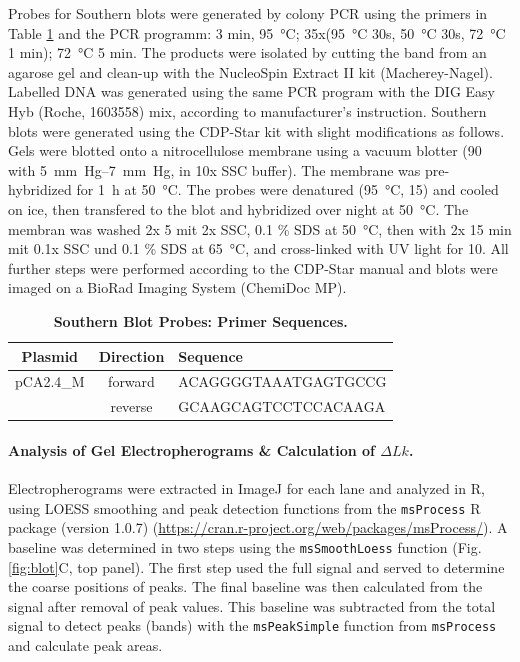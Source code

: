 \documentclass[10pt,a4]{article}
\newcommand{\remove}[1]{\begingroup\color{gray}\endgroup}
\begin{document}
Probes for Southern blots were generated by colony PCR using the
primers in Table \ref{tab:blot} and the PCR programm: 3 min,
\SI{95}{\celsius}; 35x(\SI{95}{\celsius} 30s, \SI{50}{\celsius} 30s,
\SI{72}{\celsius} 1 min); \SI{72}{\celsius} 5 min.  The products were
isolated by cutting the band from an agarose gel and clean-up with the
NucleoSpin Extract II kit (Macherey-Nagel).  Labelled DNA was
generated using the same PCR program with the DIG Easy Hyb (Roche,
1603558) mix, according to manufacturer's instruction.
%
Southern blots were generated using the CDP-Star kit with slight
modifications as follows.  Gels were blotted onto a nitrocellulose
membrane using a vacuum blotter \remove{model?} (\SI{90}{\min} with
\SIrange{5}{7}{mm Hg}, in 10x SSC buffer). The membrane was
pre-hybridized for \SI{1}{\hour} at \SI{50}{\celsius}.  The probes
were denatured (\SI{95}{\celsius}, \SI{15}{\min}) and cooled on ice,
then transfered to the blot and hybridized over night at
\SI{50}{\celsius}. The membran was washed 2x \SI{5}{\min} mit 2x SSC,
0.1 \% SDS at \SI{50}{\celsius}, then with 2x 15 min mit 0.1x SSC und
0.1 \% SDS at \SI{65}{\celsius}, and cross-linked with UV light
\remove{model} for \SI{10}{\min}. All further steps were performed
according to the CDP-Star manual and blots were imaged on a
  BioRad Imaging System (ChemiDoc MP).





\begin{table}[ht!]
  \begin{tabular}{c|c|l}
    Plasmid & Direction & Sequence \\
    \hline
    pCA2.4\_M &forward & ACAGGGGTAAATGAGTGCCG\\ %
    &reverse & GCAAGCAGTCCTCCACAAGA  %
  \end{tabular}
  \caption{\textbf{Southern Blot Probes: Primer Sequences.}}
  \label{tab:blot}
\end{table}


\paragraph{Analysis of Gel Electropherograms \& Calculation of $\Delta Lk$.}
Electropherograms were extracted in ImageJ for each lane and analyzed
in R, using LOESS smoothing and peak detection functions from the
\texttt{msProcess} R package (version 1.0.7)
(\url{https://cran.r-project.org/web/packages/msProcess/}). A baseline
was determined in two steps using the \texttt{msSmoothLoess} function
(Fig. \ref{fig:blot}C, top panel).  The first step used the full
signal and served to determine the coarse positions of peaks.  The
final baseline was then calculated from the signal after removal of
peak values. This baseline was subtracted from the total signal to
detect peaks (bands) with the \texttt{msPeakSimple} function from
\texttt{msProcess} and calculate peak areas.  
\end{document}
